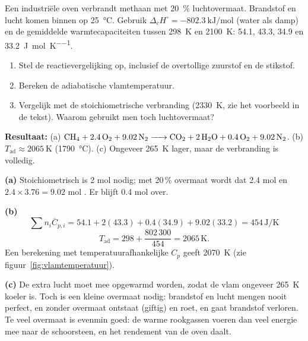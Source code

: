 \begin{oefening}
Een industri\"ele oven verbrandt methaan met \SI{20}{\percent} luchtovermaat. Brandstof en lucht komen binnen op \SI{25}{\celsius}. Gebruik $\Delta_c H^\circ = \SI{-802.3}{\kilo\joule\per\mole}$ (water als damp) en de gemiddelde warmtecapaciteiten tussen \SI{298}{\kelvin} en \SI{2100}{\kelvin}:  \SI{54.1}{},  \SI{43.3}{},  \SI{34.9}{} en  \SI{33.2}{\joule\per\mole\per\kelvin}.
\begin{enumerate}
\item[(a)] Stel de reactievergelijking op, inclusief de overtollige zuurstof en de stikstof.
\item[(b)] Bereken de adiabatische vlamtemperatuur.
\item[(c)] Vergelijk met de stoichiometrische verbranding (\SI{2330}{\kelvin}, zie het voorbeeld in de tekst). Waarom gebruikt men toch luchtovermaat?
\end{enumerate}
\end{oefening}
\begin{oplossing}
\textbf{Resultaat:} (a) $\ce{CH4 + 2.4 O2 + 9.02 N2 -> CO2 + 2 H2O + 0.4 O2 + 9.02 N2}$. (b) $T_\mathrm{ad} \approx \SI{2065}{\kelvin}$ (\SI{1790}{\celsius}). (c) Ongeveer \SI{265}{\kelvin} lager, maar de verbranding is volledig.

\textbf{(a)} Stoichiometrisch is 2 mol  nodig; met 20\,\% overmaat wordt dat 2.4 mol  en $2.4 \times 3.76 = 9.02$ mol . Er blijft 0.4 mol  over.

\textbf{(b)}
\[
\sum n_i \overline{C}_{p,i} = 54.1 + 2(43.3) + 0.4(34.9) + 9.02(33.2) = 454\,\mathrm{J/K}
\]
\[
T_\mathrm{ad} = 298 + \frac{802\,300}{454} = 2065\,\mathrm{K}.
\]
Een berekening met temperatuurafhankelijke $C_p$ geeft \SI{2070}{\kelvin} (zie figuur~\ref{fig:vlamtemperatuur}).

\textbf{(c)} De extra lucht moet mee opgewarmd worden, zodat de vlam ongeveer \SI{265}{\kelvin} koeler is. Toch is een kleine overmaat nodig: brandstof en lucht mengen nooit perfect, en zonder overmaat ontstaat  (giftig) en roet, en gaat brandstof verloren. Te veel overmaat is evenmin goed: de warme rookgassen voeren dan veel energie mee naar de schoorsteen, en het rendement van de oven daalt.
\end{oplossing}

